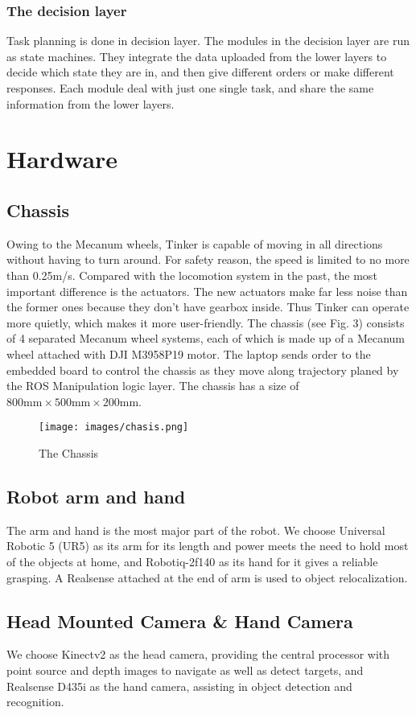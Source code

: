 \documentclass[runningheads,UTF8,fntef,a4paper]{llncs}
\begin{document}
\subsubsection{The decision layer}
Task planning is done in decision layer. The modules in the decision layer are run as state machines. They integrate the data uploaded from the lower layers to decide which state they are in, and then give diﬀerent orders or make diﬀerent responses. Each module deal with just one single task, and share the same information from the lower layers.

\section{Hardware}

\subsection{Chassis}
Owing to the Mecanum wheels, Tinker is capable of moving in all directions without having to turn around. For safety reason, the speed is limited to no more than 0.25m/s. Compared with the locomotion system in the past, the most important difference is the actuators. The new actuators make far less noise than the former ones because they don't have gearbox inside. Thus Tinker can operate more quietly, which makes it more user-friendly. The chassis (see Fig. 3) consists of 4 separated Mecanum wheel systems, each of which is made up of a Mecanum wheel attached with DJI M3958P19 motor. The laptop sends order to the embedded board to control the chassis as they move along trajectory planed by the ROS Manipulation logic layer. The chassis has a size of $800\text{mm} \times 500\text{mm}\times 200\text{mm}$.
\begin{figure}[!t]
	\centering
	\texttt{[image: images/chasis.png]}
	\caption{The Chassis}
	\label{chas}
\end{figure}

\subsection{Robot arm and hand}
The arm and hand is the most major part of the robot. We choose Universal Robotic 5 (UR5) as its arm for its length and power meets the need to hold most of the objects at home, and Robotiq-2f140 as its hand for it gives a reliable grasping. A Realsense attached at the end of arm is used to object relocalization.

\subsection{Head Mounted Camera \& Hand Camera}
We choose Kinectv2 as the head camera, providing the central processor with point source and depth images to navigate as well as detect targets, and Realsense D435i as the hand camera, assisting in object detection and recognition.
\end{document}
